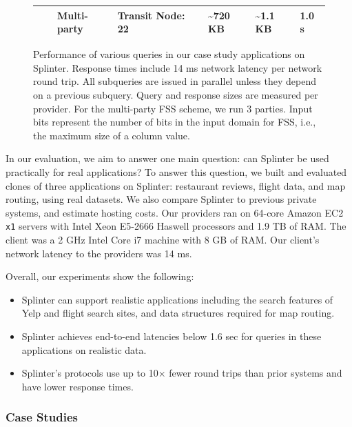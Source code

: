 \begin{figure}
{\begin{tabular}{llllp{1cm}p{2cm}p{2cm}p{1.5cm}}
			& & Multi-party & Transit Node: 22 & & \textasciitilde 720 KB & \textasciitilde 1.1 KB & 1.0 s \\
			\bottomrule
		\end{tabular}
	}
	\caption[Performance results for Splinter case studies.]{Performance of various queries in our case study applications on Splinter. 
		Response times include 14 ms network latency per network round trip. All subqueries are issued in parallel
		unless they depend on a previous subquery. Query and response sizes are measured per provider. For the multi-party FSS scheme, we run 3 parties.
		Input bits represent the number of bits in the input domain for FSS, i.e., the maximum size of a column value.}
	\label{fig:big-results}
\end{figure}

In our evaluation, we aim to answer one main question: can Splinter
be used practically for real applications? To answer this question,
we built and evaluated clones of three applications 
on Splinter: restaurant reviews, flight data, and map routing, using real datasets.
We also compare Splinter to previous private systems, and estimate hosting costs.
Our providers ran on 64-core Amazon EC2 \texttt{x1} servers with Intel Xeon E5-2666 Haswell processors and 1.9 TB 
of RAM. The client was a 2 GHz Intel Core i7 machine with 8 GB of RAM.
Our client's network latency to the providers was 14 ms.

Overall, our experiments show the following: 
\begin{itemize}
	\item{Splinter can support realistic applications including the search features of Yelp and flight search sites, and data structures
		required for map routing.}
	\item{Splinter achieves end-to-end latencies below 1.6 sec for queries in these applications on realistic data.}
	\item{Splinter's protocols use up to 10$\times$ fewer round trips than prior systems and have lower response times.}
\end{itemize}


\subsubsection{Case Studies}
\label{sec:case_studies}


